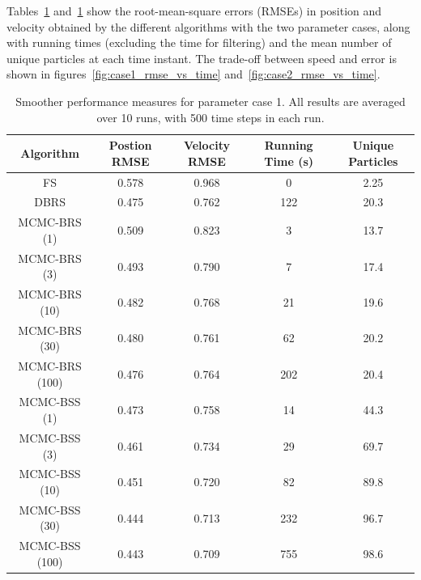 \documentclass[journal]{IEEEtran}
\begin{document}
Tables~\ref{tab:case1_performance} and~\ref{tab:case1_performance} show the root-mean-square errors (RMSEs) in position and velocity obtained by the different algorithms with the two parameter cases, along with running times (excluding the time for filtering) and the mean number of unique particles at each time instant. The trade-off between speed and error is shown in figures~\ref{fig:case1_rmse_vs_time} and~\ref{fig:case2_rmse_vs_time}.

\begin{table}[!t]%
\renewcommand{\arraystretch}{1.3}
\caption{Smoother performance measures for parameter case 1. All results are averaged over 10 runs, with 500 time steps in each run.}
\label{tab:case1_performance}
\centering
\begin{tabular}{|c||c|c|c|c|}
\hline
Algorithm & \begin{minipage}[c]{1cm} Postion RMSE \end{minipage} & \begin{minipage}[c]{1cm}  Velocity RMSE \end{minipage} & \begin{minipage}[c]{1cm}  Running Time (s) \end{minipage} & \begin{minipage}[c]{1cm}  Unique Particles \end{minipage} \\
\hline
FS 						& 0.578 & 0.968 & 0 & 2.25 \\
DBRS					& 0.475 & 0.762 & 122 & 20.3 \\
\hline
MCMC-BRS (1)	& 0.509 & 0.823 & 3 & 13.7 \\
MCMC-BRS (3)	& 0.493 & 0.790 & 7 & 17.4 \\
MCMC-BRS (10)	& 0.482 & 0.768 & 21 & 19.6 \\
MCMC-BRS (30)	& 0.480 & 0.761 & 62 & 20.2 \\
MCMC-BRS (100)& 0.476 & 0.764 & 202 & 20.4 \\
\hline
MCMC-BSS (1)	& 0.473 & 0.758 & 14 & 44.3 \\
MCMC-BSS (3)	& 0.461 & 0.734 & 29 & 69.7 \\
MCMC-BSS (10)	& 0.451 & 0.720 & 82 & 89.8 \\
MCMC-BSS (30)	& 0.444 & 0.713 & 232 & 96.7 \\
MCMC-BSS (100)& 0.443 & 0.709 & 755 & 98.6 \\
\hline
\end{tabular}
\end{table}
\end{document}
